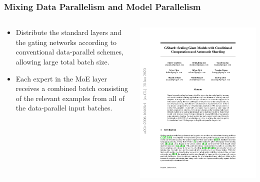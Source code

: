 \documentclass[12pt,aspectratio=169]{beamer}
\begin{document}
    \begin{frame}
        \frametitle{Mixing Data Parallelism and Model Parallelism}

        \begin{columns}
        \begin{column}{0.55\textwidth}
            \begin{itemize}
                \setlength{\itemsep}{.8em}
                \item Distribute the standard layers and the gating networks according to conventional data-parallel schemes, allowing large total batch size.
                \item Each expert in the MoE layer receives a combined batch consisting of the relevant examples from all of the data-parallel input batches.
            \end{itemize}
        \end{column}
        \begin{column}{0.45\textwidth}
            \centering
            \includegraphics[page=5,trim=10.5cm 16.8cm 4cm 3cm,clip,scale=0.8]{GShards.pdf}
        \end{column}
        \end{columns}
    \end{frame}
\end{document}
